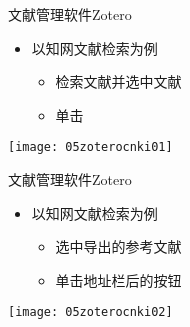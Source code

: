 \documentclass[fontset = none, t]{ctexbeamer}
\begin{document}
\begin{frame}[fragile]{文献管理软件}{Zotero}
  \begin{spacing}{1.2}
    \begin{itemize}
    \item 以\alert{知网}文献检索为例
      \begin{itemize}
      \item 检索文献并选中文献
      \item 单击
      \end{itemize}
    \end{itemize}    
    \begin{center}
      \begin{annotatedFigure}
        {\texttt{[image: 05zoterocnki01]}}
      \end{annotatedFigure}      
    \end{center}
  \end{spacing}
\end{frame}

\begin{frame}[fragile]{文献管理软件}{Zotero}
  \begin{spacing}{1.2}
    \begin{itemize}
    \item 以\alert{知网}文献检索为例
      \begin{itemize}
      \item 选中导出的参考文献
      \item 单击地址栏后的按钮
      \end{itemize}
    \end{itemize}    
    \begin{center}
      \begin{annotatedFigure}
        {\texttt{[image: 05zoterocnki02]}}
      \end{annotatedFigure}      
    \end{center}
  \end{spacing}
\end{frame}
\end{document}
